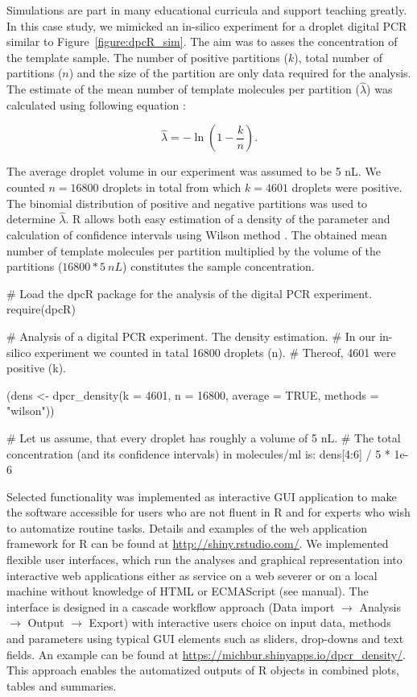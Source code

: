 Simulations are part in many educational curricula and support teaching 
greatly. In this case study, we mimicked an in-silico experiment for a droplet 
digital PCR similar to Figure~\ref{figure:dpcR_sim}. The aim was to asses the 
concentration of the template sample. The number of positive partitions ($k$), 
total number of partitions ($n$) and the size of the partition are only data 
required for the analysis. The estimate of the mean number of template molecules 
per partition ($\hat \lambda$) was calculated using following equation 
\citep{huggett_2013}:

\begin{equation}
\hat{\lambda} =  -\ln{(1 - \frac{k}{n})}.
\end{equation}

The average droplet volume in our experiment was assumed to be 5 nL. We counted 
$n = 16800$ droplets in total from which $k = 4601$ droplets were positive. The 
binomial distribution of positive and negative partitions was used to determine 
$\hat \lambda$. R allows both easy estimation of a density of the parameter and 
calculation of confidence intervals using Wilson method \citep{brown_2001}. The 
obtained mean number of template molecules per partition multiplied by the 
volume of the partitions ($ 16800 * 5~nL$) constitutes the sample concentration.

\begin{example}
# Load the dpcR package for the analysis of the digital PCR experiment.
require(dpcR)

# Analysis of a digital PCR experiment. The density estimation.
# In our in-silico experiment we counted in tatal 16800 droplets (n). 
# Thereof, 4601 were positive (k).

(dens <- dpcr_density(k = 4601, n = 16800, average = TRUE, methods = "wilson"))

# Let us assume, that every droplet has roughly a volume of 5 nL.
# The total concentration (and its confidence intervals) in molecules/ml is:
dens[4:6] / 5 * 1e-6
\end{example}

Selected functionality was implemented as interactive  GUI 
application to make the software accessible for users who are not fluent in R 
and for experts who wish to automatize routine tasks. Details and examples of 
the  web application framework for R can be found at 
\url{http://shiny.rstudio.com/}. We implemented 
flexible user interfaces, which run the analyses and graphical representation 
into interactive web applications either as service on a web severer or on a 
local machine without knowledge of HTML or ECMAScript (see  
manual). The interface is designed in a cascade workflow approach (Data import 
$\rightarrow$ Analysis $\rightarrow$ Output $\rightarrow$ Export) with 
interactive users choice on input data, methods and parameters using typical GUI 
elements such as sliders, drop-downs and text fields. An example can be found at 
\url{https://michbur.shinyapps.io/dpcr_density/}. This approach enables the 
automatized outputs of R objects in combined plots, tables and summaries.

